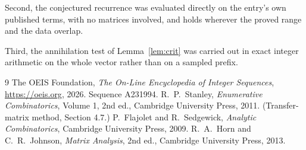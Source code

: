 \documentclass[11pt,a4paper]{article}
\theoremstyle{plain}
\theoremstyle{definition}
\begin{document}
Second, the conjectured recurrence was evaluated directly on the entry's own published terms,
with no matrices involved, and holds wherever the proved range and the data overlap.

Third, the annihilation test of Lemma~\ref{lem:crit} was carried out in exact integer
arithmetic on the whole vector rather than on a sampled prefix.

\begin{thebibliography}{9}
 The OEIS Foundation, \emph{The On-Line Encyclopedia of Integer
Sequences}, \url{https://oeis.org}, 2026. Sequence A231994.
 R.~P.~Stanley, \emph{Enumerative Combinatorics}, Volume 1, 2nd ed.,
Cambridge University Press, 2011. (Transfer-matrix method, Section 4.7.)
 P.~Flajolet and R.~Sedgewick, \emph{Analytic Combinatorics}, Cambridge
University Press, 2009.
 R.~A.~Horn and C.~R.~Johnson, \emph{Matrix Analysis}, 2nd ed., Cambridge
University Press, 2013.
\end{thebibliography}
\end{document}
